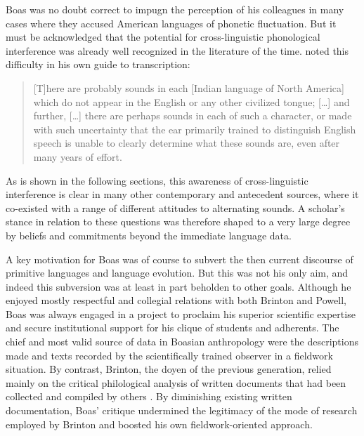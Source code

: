 \documentclass[output=paper]{langscibook}
\begin{document}
Boas was no doubt correct to impugn the perception of his colleagues in many cases where they accused American languages of phonetic fluctuation. But it must be acknowledged that the potential for cross-linguistic phonological interference was already well recognized in the literature of the time. \citet[2]{Powell18801877} noted this difficulty in his own guide to transcription:

\begin{quotation}
[T]here are probably sounds in each [Indian language of North America] which do not appear in the English or any other civilized tongue; […] and further, […] there are perhaps sounds in each of such a character, or made with such uncertainty that the ear primarily trained to distinguish English speech is unable to clearly determine what these sounds are, even after many years of effort. \citep[2]{Powell18801877}
\end{quotation}

As is shown in the following sections, this awareness of cross-linguistic interference is clear in many other contemporary and antecedent sources, where it co-existed with a range of different attitudes to alternating sounds. A scholar's stance in relation to these questions was therefore shaped to a very large degree by beliefs and commitments beyond the immediate language data.

A key motivation for Boas was of course to subvert the then current discourse of primitive languages and language evolution. But this was not his only aim, and indeed this subversion was at least in part beholden to other goals. Although he enjoyed mostly respectful and collegial relations with both Brinton and Powell, Boas was always engaged in a project to proclaim his superior scientific expertise and secure institutional support for his clique of students and adherents. The chief and most valid source of data in Boasian anthropology were the descriptions made and texts recorded by the scientifically trained observer in a fieldwork situation. By contrast, Brinton, the doyen of the previous generation, relied mainly on the critical philological analysis of written documents that had been collected and compiled by others \citep[see][21-24]{Darnell1988}. By diminishing existing written documentation, Boas' critique undermined the legitimacy of the mode of research employed by Brinton and boosted his own fieldwork-oriented approach.
\end{document}
